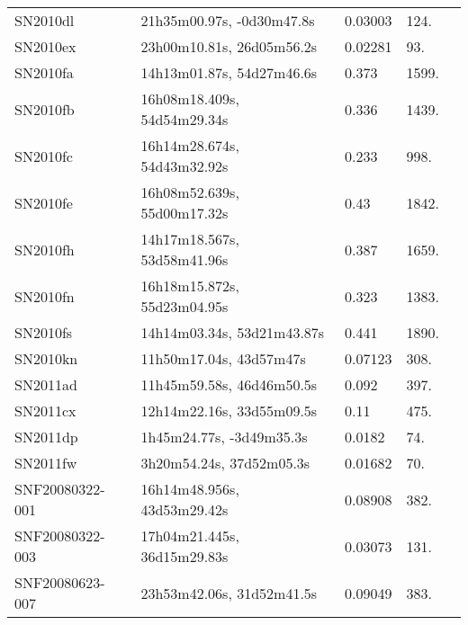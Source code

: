 \begin{longtable}{lllll}
         SN2010dl &      21h35m00.97s, -0d30m47.8s &  0.03003 &           124. &    \citet{20096dF...C...0000J} \\
         SN2010ex &      23h00m10.81s, 26d05m56.2s &  0.02281 &            93. &    \citet{2008AJ....135..588S} \\
         SN2010fa &      14h13m01.87s, 54d27m46.6s &    0.373 &          1599. &    \citet{2010CBET.2350A...1C} \\
         SN2010fb &    16h08m18.409s, 54d54m29.34s &    0.336 &          1439. &    \citet{2010CBET.2350A...1C} \\
         SN2010fc &    16h14m28.674s, 54d43m32.92s &    0.233 &           998. &    \citet{2010CBET.2350A...1C} \\
         SN2010fe &    16h08m52.639s, 55d00m17.32s &     0.43 &          1842. &    \citet{2010CBET.2350A...1C} \\
         SN2010fh &    14h17m18.567s, 53d58m41.96s &    0.387 &          1659. &    \citet{2010CBET.2350A...1C} \\
         SN2010fn &    16h18m15.872s, 55d23m04.95s &    0.323 &          1383. &    \citet{2010CBET.2350A...1C} \\
         SN2010fs &     14h14m03.34s, 53d21m43.87s &    0.441 &          1890. &    \citet{2010CBET.2350A...1C} \\
         SN2010kn &        11h50m17.04s, 43d57m47s &  0.07123 &           308. &    \citet{2005SDSS4.C...0000:} \\
         SN2011ad &      11h45m59.58s, 46d46m50.5s &    0.092 &           397. &    \citet{2011CBET.2657A...1Z} \\
         SN2011cx &      12h14m22.16s, 33d55m09.5s &     0.11 &           475. &    \citet{2011CBET.2733A...1D} \\
         SN2011dp &       1h45m24.77s, -3d49m35.3s &   0.0182 &            74. &    \citet{1993AJ....106.1273Z} \\
         SN2011fw &       3h20m54.24s, 37d52m05.3s &  0.01682 &            70. &    \citet{1999ApJS..121..287H} \\
  SNF20080322-001 &    16h14m48.956s, 43d53m29.42s &  0.08908 &           382. &    \citet{2004SDSS2.C...0000:} \\
  SNF20080322-003 &    17h04m21.445s, 36d15m29.83s &  0.03073 &           131. &    \citet{2004SDSS2.C...0000:} \\
  SNF20080623-007 &      23h53m42.06s, 31d52m41.5s &  0.09049 &           383. &    \citet{2013ApJ...770..107C} \\

\end{longtable}
